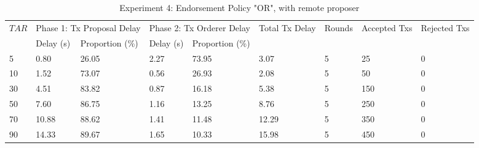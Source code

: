 \documentclass[10pt,journal,compsoc, twoside]{IEEEtran}
\begin{document}
\begin{table*}[htbp]
	\caption{Experiment 4: Endorsement Policy "OR", with remote proposer}
	\begin{tabular}{|l|l|l|l|l|l|l|l|l|}
		\hline
		\multirow{2}{*}{$TAR$} & \multicolumn{2}{l|}{Phase 1: Tx Proposal Delay} & \multicolumn{2}{l|}{Phase 2: Tx Orderer Delay} & \multirow{2}{*}{Total Tx Delay} & \multirow{2}{*}{Rounds} & \multirow{2}{*}{Accepted Txs} & \multirow{2}{*}{Rejected Txs} \\ \cline{2-5}
		& Delay (s)           & Proportion (\%)           & Delay (s)           & Proportion (\%)          &                                 &                         &                               &                               \\ \hline
		5                      & 0.80                & 26.05                     & 2.27                & 73.95                    & 3.07                            & 5                       & 25                            & 0                             \\ \hline
		10                     & 1.52                & 73.07                     & 0.56                & 26.93                    & 2.08                            & 5                       & 50                            & 0                             \\ \hline
		30                     & 4.51                & 83.82                     & 0.87                & 16.18                    & 5.38                            & 5                       & 150                           & 0                             \\ \hline
		50                     & 7.60                & 86.75                     & 1.16                & 13.25                    & 8.76                            & 5                       & 250                           & 0                             \\ \hline
		70                     & 10.88               & 88.62                     & 1.41                & 11.48                    & 12.29                           & 5                       & 350                           & 0                             \\ \hline
		90                     & 14.33               & 89.67                     & 1.65                & 10.33                    & 15.98                           & 5                       & 450                           & 0                             \\ \hline
	\end{tabular}
\end{table*}
\end{document}
